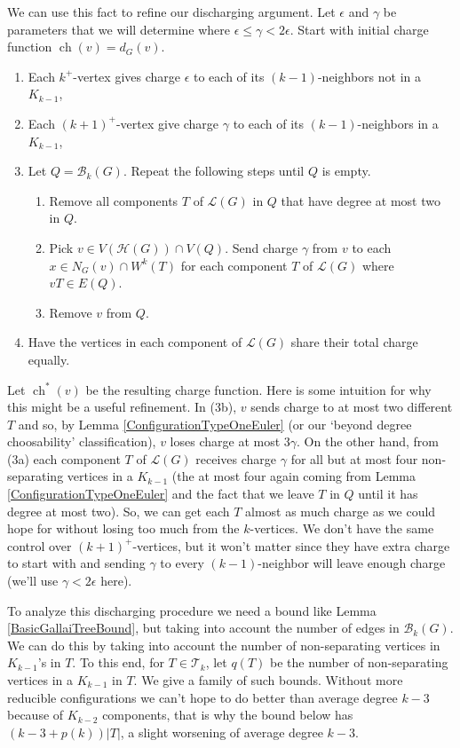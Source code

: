 \documentclass[12pt]{article}
\theoremstyle{plain}
\theoremstyle{definition}
\theoremstyle{remark}
\newcommand{\fancy}[1]{\mathcal{#1}}
\newcommand{\T}{\fancy{T}}
\newcommand{\B}{\fancy{B}}
\renewcommand{\L}{\fancy{L}}
\newcommand{\HH}{\fancy{H}}
\newcommand{\ch}{\operatorname{ch}}
\begin{document}
We can use this fact to refine our discharging argument.  Let $\epsilon$ and $\gamma$ be parameters that we will determine where $\epsilon \le \gamma < 2\epsilon$. Start with initial charge function $\ch(v) = d_G(v)$.  
\begin{enumerate}
	\item Each $k^+$-vertex gives charge $\epsilon$ to each of its $(k-1)$-neighbors not in a $K_{k-1}$,
	\item Each $(k+1)^+$-vertex give charge $\gamma$ to each of its $(k-1)$-neighbors in a $K_{k-1}$,
	\item Let $Q = \B_k(G)$.  Repeat the following steps until $Q$ is empty.
	  \begin{enumerate}
	  	\item Remove all components $T$ of $\L(G)$ in $Q$ that have degree at most two in $Q$.
	  	\item Pick $v \in V(\HH(G)) \cap V(Q)$.  Send charge $\gamma$ from $v$ to each $x \in N_G(v) \cap W^k(T)$ for each component $T$ of $\L(G)$ where $vT \in E(Q)$.
	  	\item Remove $v$ from $Q$.
	  \end{enumerate}
	\item Have the vertices in each component of $\L(G)$ share their total charge equally.
\end{enumerate}
Let $\ch^*(v)$ be the resulting charge function.  Here is some intuition for why this might be a useful refinement.  In (3b), $v$ sends charge to at most two different $T$ and so, by Lemma \ref{ConfigurationTypeOneEuler} (or our `beyond degree choosability' classification), $v$ loses charge at most $3\gamma$.  On the other hand, from (3a) each component $T$ of $\L(G)$ receives charge $\gamma$ for all but at most four non-separating vertices in a $K_{k-1}$ (the at most four again coming from Lemma \ref{ConfigurationTypeOneEuler} and the fact that we leave $T$ in $Q$ until it has degree at most two).  So, we can get each $T$ almost as much charge as we could hope for without losing too much from the $k$-vertices.  We don't have the same control over $(k+1)^+$-vertices, but it won't matter since they have extra charge to start with and sending $\gamma$ to every $(k-1)$-neighbor will leave enough charge (we'll use $\gamma < 2\epsilon$ here).

To analyze this discharging procedure we need a bound like Lemma \ref{BasicGallaiTreeBound}, but taking into account the number of edges in $\B_k(G)$.  We can do this by taking into account the number of non-separating vertices in $K_{k-1}$'s in $T$.  To this end, for $T \in \T_k$, let $q(T)$ be the number of non-separating vertices in a $K_{k-1}$ in $T$.  We give a family of such bounds.  Without more reducible configurations we can't hope to do better than average degree $k-3$ because of $K_{k-2}$ components, that is why the bound below has $(k-3 + p(k))|T|$, a slight worsening of average degree $k-3$.
\end{document}
